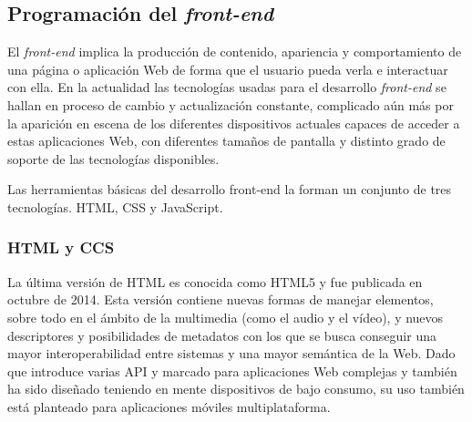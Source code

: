

\subsection{Programación del \emph{front-end}}

El \emph{front-end} implica la producción de contenido, apariencia y comportamiento de una página o aplicación Web de forma que el usuario pueda verla e interactuar con ella. En la actualidad las tecnologías usadas para el desarrollo \emph{front-end} se hallan en proceso de cambio y actualización constante, complicado aún más por la aparición en escena de los diferentes dispositivos actuales capaces de acceder a estas aplicaciones Web, con diferentes tamaños de pantalla y distinto grado de soporte de las tecnologías disponibles.

Las herramientas básicas del desarrollo front-end la forman un conjunto de tres tecnologías. HTML, CSS y JavaScript.

\subsubsection{HTML y  CCS}

La última versión de HTML es conocida como HTML5 y fue publicada en octubre de 2014. Esta versión contiene nuevas formas de manejar elementos, sobre todo en el ámbito de la multimedia (como el audio y el vídeo), y nuevos descriptores y posibilidades de metadatos con los que se busca conseguir una mayor interoperabilidad entre sistemas y una mayor semántica de la Web. Dado que introduce varias API y marcado para aplicaciones Web complejas y también ha sido diseñado teniendo en mente dispositivos de bajo consumo, su uso también está planteado para aplicaciones móviles multiplataforma.

